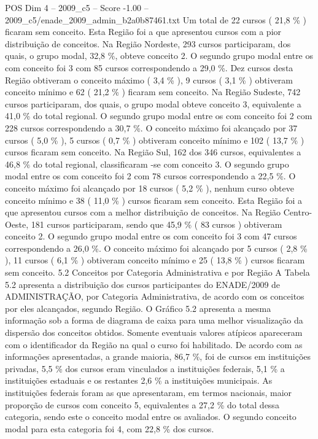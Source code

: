\begin{textsample}{POS Dim 4 – 2009\_c5 – Score -1.00 – 2009\_c5/enade\_2009\_admin\_b2a0b87461.txt}
Um total de 22 cursos ( 21,8 \% ) ficaram sem conceito.
Esta Região foi a que apresentou cursos com a pior distribuição de conceitos.
Na Região Nordeste, 293 cursos participaram, dos quais, o grupo modal, 32,8 \%, obteve conceito 2.
O segundo grupo modal entre os com conceito foi 3 com 85 cursos correspondendo a 29,0 \%.
Dez cursos desta Região obtiveram o conceito máximo ( 3,4 \% ), 9 cursos ( 3,1 \% ) obtiveram conceito mínimo e 62 ( 21,2 \% ) ficaram sem conceito.
Na Região Sudeste, 742 cursos participaram, dos quais, o grupo modal obteve conceito 3, equivalente a 41,0 \% do total regional.
O segundo grupo modal entre os com conceito foi 2 com 228 cursos correspondendo a 30,7 \%.
O conceito máximo foi alcançado por 37 cursos ( 5,0 \% ), 5 cursos ( 0,7 \% ) obtiveram conceito mínimo e 102 ( 13,7 \% ) cursos ficaram sem conceito.
Na Região Sul, 162 dos 346 cursos, equivalentes a 46,8 \% do total regional, classificaram -se com conceito 3.
O segundo grupo modal entre os com conceito foi 2 com 78 cursos correspondendo a 22,5 \%.
O conceito máximo foi alcançado por 18 cursos ( 5,2 \% ), nenhum curso obteve conceito mínimo e 38 ( 11,0 \% ) cursos ficaram sem conceito.
Esta Região foi a que apresentou cursos com a melhor distribuição de conceitos.
Na Região Centro-Oeste, 181 cursos participaram, sendo que 45,9 \% ( 83 cursos ) obtiveram conceito 2.
O segundo grupo modal entre os com conceito foi 3 com 47 cursos correspondendo a 26,0 \%.
O conceito máximo foi alcançado por 5 cursos ( 2,8 \% ), 11 cursos ( 6,1 \% ) obtiveram conceito mínimo e 25 ( 13,8 \% ) cursos ficaram sem conceito. 5.2 Conceitos por Categoria Administrativa e por Região A Tabela 5.2 apresenta a distribuição dos cursos participantes do ENADE/2009 de ADMINISTRAÇÃO, por Categoria Administrativa, de acordo com os conceitos por eles alcançados, segundo Região.
O Gráfico 5.2 apresenta a mesma informação sob a forma de diagrama de caixa para uma melhor visualização da dispersão dos conceitos obtidos.
Somente eventuais valores atípicos apareceram com o identificador da Região na qual o curso foi habilitado.
De acordo com as informações apresentadas, a grande maioria, 86,7 \%, foi de cursos em instituições privadas, 5,5 \% dos cursos eram vinculados a instituições federais, 5,1 \% a instituições estaduais e os restantes 2,6 \% a instituições municipais.
As instituições federais foram as que apresentaram, em termos nacionais, maior proporção de cursos com conceito 5, equivalentes a 27,2 \% do total dessa categoria, sendo este o conceito modal entre os avaliados.
O segundo conceito modal para esta categoria foi 4, com 22,8 \% dos cursos.

\end{textsample}
